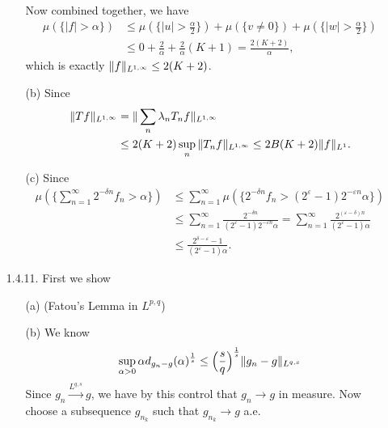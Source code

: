 \begin{enumerate}
\begin{enumerate}
\begin{equation*}
\begin{aligned}
   \end{aligned}\end{equation*}
   Now combined together, we have
   \begin{equation*}\begin{aligned}
   \mu(\{|f|>\alpha\}) &\leq \mu(\{|u|>\frac{\alpha}{2}\}) + \mu(\{v \neq 0\}) + \mu(\{|w|>\frac{\alpha}{2}\})
   \\&\leq 0 + \frac{2}{\alpha} + \frac{2}{\alpha}(K+1) = \frac{2(K+2)}{\alpha},
   \nonumber\end{aligned}\end{equation*}
   which is exactly $\norm{f}_{L^{1,\infty}} \leq 2(K+2)$.

   \item[(b)] Since 
   \begin{equation*}\begin{aligned}
   \norm{Tf}_{L^{1,\infty}} &= \norm{\sum_{n}\lambda_{n}T_{n}f}_{L^{1,\infty}} 
   \\&\leq 2(K+2)\sup\limits_{n}\norm{T_{n}f}_{L^{1,\infty}} \leq 2B(K+2)\norm{f}_{L^{1}}.
   \end{aligned}\end{equation*}

   \item[(c)] Since
   \begin{equation*}\begin{aligned}
   \mu(\{\sum_{n=1}^{\infty}2^{-\delta n}f_{n}>\alpha\}) 
   &\leq \sum_{n=1}^{\infty}\mu(\{2^{-\delta n}f_{n}>(2^{\varepsilon}-1)2^{-\varepsilon n}\alpha\})\\
   &\leq \sum_{n=1}^{\infty} \frac{2^{-\delta n}}{(2^{\varepsilon}-1)2^{-\varepsilon n}\alpha} 
   = \sum_{n=1}^{\infty} \frac{2^{(\varepsilon-\delta)n}}{(2^{\varepsilon}-1)\alpha}\\
   &\leq \frac{2^{\delta-\varepsilon}-1}{(2^{\varepsilon}-1)\alpha}.
   \end{aligned}\end{equation*}
   \end{enumerate}

\item[1.4.11.]
   First we show
   \begin{enumerate}
   \item[(a)] (Fatou's Lemma in $L^{p,q}$) 
   \item[(b)] We know 
   \[\sup_{\alpha >0} \alpha d_{g_{n}-g}(\alpha)^{\frac{1}{s}} \leq \Big(\frac{s}{q}\Big)^{\frac{1}{s}}\Vert g_{n}-g \Vert_{L^{q,s}}\]
   Since $g_{n} \overset{L^{q,s}}{\to} g$, we have by this control that $g_{n} \to g$ in measure. 
   Now choose a subsequence $g_{n_{k}}$ such that $g_{n_{k}} \to g$ a.e. 
   \end{enumerate}


\end{enumerate}
